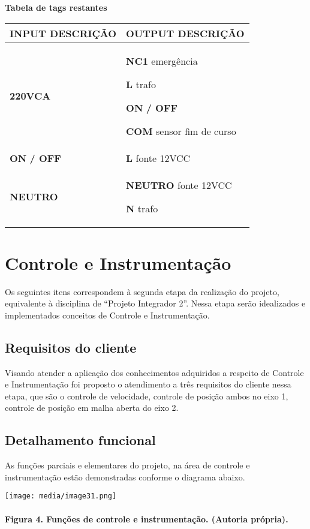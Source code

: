 \documentclass[]{article}
\let\oldparagraph\paragraph
\renewcommand{\paragraph}[1]{\oldparagraph{#1}\mbox{}}
\begin{document}
\textbf{Tabela de tags restantes}

\begin{longtable}[]{@{}ll@{}}
\toprule
INPUT DESCRIÇÃO & OUTPUT DESCRIÇÃO\tabularnewline
\midrule
\endhead
\textbf{220VCA} & \textbf{NC1} emergência

\textbf{L} trafo

\textbf{ON} \textbf{/ OFF}

\textbf{COM} sensor fim de curso\tabularnewline
\textbf{ON} \textbf{/ OFF} & \textbf{L} fonte 12VCC\tabularnewline
\textbf{NEUTRO} & \textbf{NEUTRO} fonte 12VCC

\textbf{N} trafo\tabularnewline
\bottomrule
\end{longtable}

\section{Controle e
Instrumentação}\label{controle-e-instrumentauxe7uxe3o}

Os seguintes itens correspondem à segunda etapa da realização do
projeto, equivalente à disciplina de ``Projeto Integrador 2''. Nessa
etapa serão idealizados e implementados conceitos de Controle e
Instrumentação.

\subsection{Requisitos do cliente}\label{requisitos-do-cliente}

Visando atender a aplicação dos conhecimentos adquiridos a respeito de
Controle e Instrumentação foi proposto o atendimento a três requisitos
do cliente nessa etapa, que são o controle de velocidade, controle de
posição ambos no eixo 1, controle de posição em malha aberta do eixo 2.

\subsection{Detalhamento funcional}\label{detalhamento-funcional}

As funções parciais e elementares do projeto, na área de controle e
instrumentação estão demonstradas conforme o diagrama abaixo.

\texttt{[image: media/image31.png]}

\paragraph{Figura 4. Funções de controle e instrumentação. (Autoria
própria).}\label{figura-4.-funuxe7uxf5es-de-controle-e-instrumentauxe7uxe3o.-autoria-pruxf3pria.}
\end{document}
